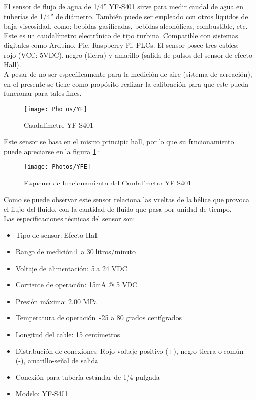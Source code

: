 \documentclass[11pt,letter
								]
								{article}
\begin{document}
El sensor de flujo de agua de 1/4'' YF-S401 sirve para medir caudal de agua en tuberías de 1/4'' de diámetro. También puede ser empleado con otros líquidos de baja viscosidad, como: bebidas gasificadas, bebidas alcohólicas, combustible, etc. Este es un caudalímetro electrónico de tipo turbina. Compatible con sistemas digitales como Arduino, Pic, Raspberry Pi, PLCs. El sensor posee  tres cables: rojo (VCC: 5VDC), negro (tierra) y amarillo (salida de pulsos del sensor de efecto Hall).\cite{t1}\\

A pesar de no ser específicamente para la medición de aire (sistema de aereación), en el presente se tiene como propósito realizar la calibración para que este pueda funcionar para tales fines.

\begin{figure}[H]
\centering
\texttt{[image: Photos/YF]}
\caption{Caudalímetro YF-S401 \cite{t1}}
\end{figure}

Este sensor se basa  en el mismo principio hall, por lo que su funcionamiento puede apreciarse  en la  figura \ref{YFE} : 
\begin{figure}[H]
\centering
\texttt{[image: Photos/YFE]}
\caption{Esquema de funcionamiento del Caudalímetro YF-S401\cite{i1}}
\label{YFE}
\end{figure}
Como se puede observar este sensor  relaciona las vueltas de la hélice  que provoca el flujo del fluido, con la cantidad de fluido que pasa por unidad de tiempo. \\

Las especificaciones técnicas del sensor son:


\begin{itemize}
\item Tipo de sensor:  Efecto Hall
\item Rango de medición:1 a 30 litros/minuto
\item Voltaje de alimentación: 5 a 24 VDC
\item Corriente de operación: 15mA @ 5 VDC
\item Presión máxima: 2.00 MPa
\item Temperatura de operación: -25 a 80 grados centígrados
\item Longitud del cable: 15 centímetros
\item Distribución de conexiones: Rojo-voltaje positivo (+), negro-tierra o común (-), amarillo-señal de salida
\item Conexión para tubería estándar de 1/4 pulgada
\item Modelo: YF-S401
\end{itemize}
\end{document}
